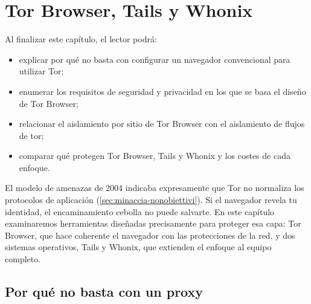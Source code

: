 \chapter{Tor Browser, Tails y Whonix}\label{cap:23-browser}

\begin{obiettivi}
Al finalizar este capítulo, el lector podrá:
\begin{itemize}[nosep]
  \item explicar por qué no basta con configurar un navegador convencional para utilizar Tor;
  \item enumerar los requisitos de seguridad y privacidad en los que se basa el diseño de Tor Browser;
  \item relacionar el aislamiento por sitio de Tor Browser con el aislamiento de flujos de tor;
  \item comparar qué protegen Tor Browser, Tails y Whonix y los costes de cada enfoque.
\end{itemize}
\end{obiettivi}

El modelo de amenazas de 2004 indicaba expresamente que Tor no normaliza los protocolos de aplicación (\cref{sec:minaccia-nonobiettivi}). Si el navegador revela tu identidad, el encaminamiento cebolla no puede salvarte. En este capítulo examinaremos herramientas diseñadas precisamente para proteger esa capa: Tor Browser, que hace coherente el navegador con las protecciones de la red, y dos sistemas operativos, Tails y Whonix, que extienden el enfoque al equipo completo.

\section{Por qué no basta con un proxy}\label{sec:browser-proxy}

